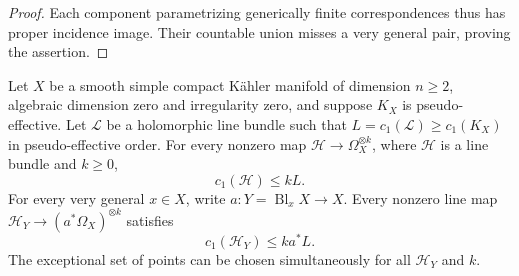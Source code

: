 \begin{proof}
Each component parametrizing generically finite correspondences thus
has proper incidence image.  Their countable union misses a very
general pair, proving the assertion.
\end{proof}

\begin{lemma}\label{zero:cotangent-slope}
Let \(X\) be a smooth simple compact Kähler manifold of dimension
\(n\ge2\), algebraic dimension zero and irregularity zero, and suppose \(K_X\) is
pseudo-effective.  Let \(\mathscr L\) be a holomorphic line bundle such
that \(L=c_1(\mathscr L)\ge c_1(K_X)\) in pseudo-effective order.
For every nonzero map \(\mathscr H\to\Omega_X^{\otimes k}\), where
\(\mathscr H\) is a line bundle and \(k\ge0\),
\begin{equation}\label{zero:slope-X}
 c_1(\mathscr H)\le kL.
\end{equation}
For every very general \(x\in X\), write
\(a:Y=\operatorname{Bl}_xX\to X\).  Every nonzero line map
\(\mathscr H_Y\to(a^*\Omega_X)^{\otimes k}\) satisfies
\begin{equation}\label{zero:slope-blowup}
 c_1(\mathscr H_Y)\le ka^*L.
\end{equation}
The exceptional set of points can be chosen simultaneously for all
\(\mathscr H_Y\) and \(k\).
\end{lemma}

